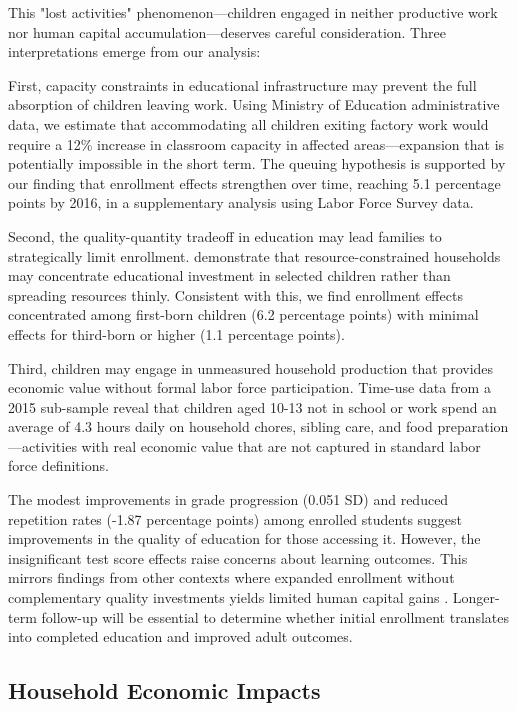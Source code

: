 \documentclass[12pt]{article}
\begin{document}
This "lost activities" phenomenon—children engaged in neither productive work nor human capital accumulation—deserves careful consideration. Three interpretations emerge from our analysis:

First, capacity constraints in educational infrastructure may prevent the full absorption of children leaving work. Using Ministry of Education administrative data, we estimate that accommodating all children exiting factory work would require a 12\% increase in classroom capacity in affected areas—expansion that is potentially impossible in the short term. The queuing hypothesis is supported by our finding that enrollment effects strengthen over time, reaching 5.1 percentage points by 2016, in a supplementary analysis using Labor Force Survey data.

Second, the quality-quantity tradeoff in education may lead families to strategically limit enrollment. \citet{behrman1988human} demonstrate that resource-constrained households may concentrate educational investment in selected children rather than spreading resources thinly. Consistent with this, we find enrollment effects concentrated among first-born children (6.2 percentage points) with minimal effects for third-born or higher (1.1 percentage points).

Third, children may engage in unmeasured household production that provides economic value without formal labor force participation. Time-use data from a 2015 sub-sample reveal that children aged 10-13 not in school or work spend an average of 4.3 hours daily on household chores, sibling care, and food preparation—activities with real economic value that are not captured in standard labor force definitions.

The modest improvements in grade progression (0.051 SD) and reduced repetition rates (-1.87 percentage points) among enrolled students suggest improvements in the quality of education for those accessing it. However, the insignificant test score effects raise concerns about learning outcomes. This mirrors findings from other contexts where expanded enrollment without complementary quality investments yields limited human capital gains \citep{pritchett2013rebasing}. Longer-term follow-up will be essential to determine whether initial enrollment translates into completed education and improved adult outcomes.


\subsection{Household Economic Impacts}
\end{document}
